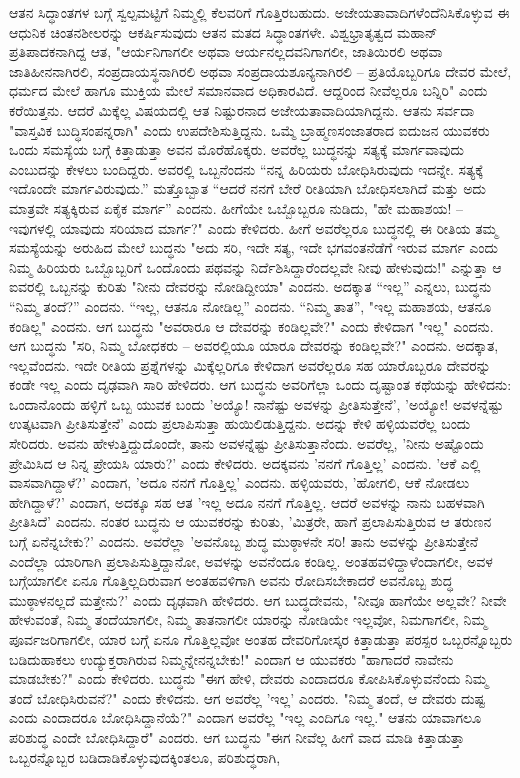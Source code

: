ಆತನ ಸಿದ್ಧಾಂತಗಳ ಬಗ್ಗೆ ಸ್ವಲ್ಪಮಟ್ಟಿಗೆ ನಿಮ್ಮಲ್ಲಿ ಕೆಲವರಿಗೆ ಗೊತ್ತಿರಬಹುದು. ಅಜೇಯತಾವಾದಿಗಳೆಂದೆನಿಸಿಕೊಳ್ಳುವ ಈ ಆಧುನಿಕ ಚಿಂತನಶೀಲರನ್ನು ಆಕರ್ಷಿಸುವುದು ಆತನ ಮತದ ಸಿದ್ಧಾಂತಗಳೇ. ವಿಶ್ವಭ್ರಾತೃತ್ವದ ಮಹಾನ್ ಪ್ರತಿಪಾದಕನಾಗಿದ್ದ ಆತ, "ಆರ್ಯನಿಗಾಗಲೀ ಅಥವಾ ಆರ್ಯನಲ್ಲದವನಿಗಾಗಲೀ, ಜಾತಿಯಿರಲಿ ಅಥವಾ ಜಾತಿಹೀನನಾಗಿರಲಿ, ಸಂಪ್ರದಾಯಸ್ಥನಾಗಿರಲಿ ಅಥವಾ ಸಂಪ್ರದಾಯಶೂನ್ಯನಾಗಿರಲಿ – ಪ್ರತಿಯೊಬ್ಬರಿಗೂ ದೇವರ ಮೇಲೆ, ಧರ್ಮದ ಮೇಲೆ ಹಾಗೂ ಮುಕ್ತಿಯ ಮೇಲೆ ಸಮಾನವಾದ ಅಧಿಕಾರವಿದೆ. ಆದ್ದರಿಂದ ನೀವೆಲ್ಲರೂ ಬನ್ನಿರಿ" ಎಂದು ಕರೆಯಿತ್ತನು. ಆದರೆ ಮಿಕ್ಕೆಲ್ಲ ವಿಷಯದಲ್ಲಿ ಆತ ನಿಷ್ಟುರನಾದ ಅಜೇಯತಾವಾದಿಯಾಗಿದ್ದನು. ಆತನು ಸರ್ವದಾ "ವಾಸ್ತವಿಕ ಬುದ್ಧಿಸಂಪನ್ನರಾಗಿ" ಎಂದು ಉಪದೇಶಿಸುತ್ತಿದ್ದನು. ಒಮ್ಮೆ ಬ್ರಾಹ್ಮಣಸಂಜಾತರಾದ ಐದುಜನ ಯುವಕರು ಒಂದು ಸಮಸ್ಯೆಯ ಬಗ್ಗೆ ಕಿತ್ತಾಡುತ್ತಾ ಅವನ ಮೊರೆಹೊಕ್ಕರು. ಅವರೆಲ್ಲ ಬುದ್ಧನನ್ನು ಸತ್ಯಕ್ಕೆ ಮಾರ್ಗವಾವುದು ಎಂಬುದನ್ನು ಕೇಳಲು ಬಂದಿದ್ದರು. ಅವರಲ್ಲಿ ಒಬ್ಬನೆಂದನು “ನನ್ನ ಹಿರಿಯರು ಬೋಧಿಸಿರುವುದು ಇದನ್ನೇ. ಸತ್ಯಕ್ಕೆ ಇದೊಂದೇ ಮಾರ್ಗವಿರುವುದು.” ಮತ್ತೊಬ್ಬಾತ “ಆದರೆ ನನಗೆ ಬೇರೆ ರೀತಿಯಾಗಿ ಬೋಧಿಸಲಾಗಿದೆ ಮತ್ತು ಅದು ಮಾತ್ರವೇ ಸತ್ಯಕ್ಕಿರುವ ಏಕೈಕ ಮಾರ್ಗ” ಎಂದನು. ಹೀಗೆಯೇ ಒಬ್ಬೊಬ್ಬರೂ ನುಡಿದು, "ಹೇ ಮಹಾಶಯ! – ಇವುಗಳಲ್ಲಿ ಯಾವುದು ಸರಿಯಾದ ಮಾರ್ಗ?" ಎಂದು ಕೇಳಿದರು. ಹೀಗೆ ಅವರೆಲ್ಲರೂ ಬುದ್ಧನಲ್ಲಿ ಈ ರೀತಿಯ ತಮ್ಮ ಸಮಸ್ಯೆಯನ್ನು ಅರುಹಿದ ಮೇಲೆ ಬುದ್ಧನು "ಅದು ಸರಿ, ಇದೇ ಸತ್ಯ, ಇದೇ ಭಗವಂತನೆಡೆಗೆ ಇರುವ ಮಾರ್ಗ ಎಂದು ನಿಮ್ಮ ಹಿರಿಯರು ಒಬ್ಬೊಬ್ಬರಿಗೆ ಒಂದೊಂದು ಪಥವನ್ನು ನಿರ್ದೆಶಿಸಿದ್ದಾರೆಂದಲ್ಲವೇ ನೀವು ಹೇಳುವುದು!" ಎನ್ನುತ್ತಾ ಆ ಐವರಲ್ಲಿ ಒಬ್ಬನನ್ನು ಕುರಿತು "ನೀನು ದೇವರನ್ನು ನೋಡಿದ್ದೀಯಾ" ಎಂದನು. ಅದಕ್ಕಾತ “ಇಲ್ಲ” ಎನ್ನಲು, ಬುದ್ಧನು “ನಿಮ್ಮ ತಂದೆ?” ಎಂದನು. “ಇಲ್ಲ, ಆತನೂ ನೋಡಿಲ್ಲ” ಎಂದನು. “ನಿಮ್ಮ ತಾತ”, "ಇಲ್ಲ ಮಹಾಶಯ, ಆತನೂ ಕಂಡಿಲ್ಲ" ಎಂದನು. ಆಗ ಬುದ್ಧನು "ಅವರಾರೂ ಆ ದೇವರನ್ನು ಕಂಡಿಲ್ಲವೇ?" ಎಂದು ಕೇಳಿದಾಗ "ಇಲ್ಲ" ಎಂದನು. ಆಗ ಬುದ್ಧನು "ಸರಿ, ನಿಮ್ಮ ಬೋಧಕರು – ಅವರಲ್ಲಿಯೂ ಯಾರೂ ದೇವರನ್ನು ಕಂಡಿಲ್ಲವೇ?" ಎಂದನು. ಅದಕ್ಕಾತ, ಇಲ್ಲವೆಂದನು. ಇದೇ ರೀತಿಯ ಪ್ರಶ್ನೆಗಳನ್ನು ಮಿಕ್ಕೆಲ್ಲರಿಗೂ ಕೇಳಿದಾಗ ಅವರೆಲ್ಲರೂ ಸಹ ಯಾರೊಬ್ಬರೂ ದೇವರನ್ನು ಕಂಡೇ ಇಲ್ಲ ಎಂದು ದೃಢವಾಗಿ ಸಾರಿ ಹೇಳಿದರು. ಆಗ ಬುದ್ಧನು ಅವರಿಗೆಲ್ಲಾ ಒಂದು ದೃಷ್ಟಾಂತ ಕಥೆಯನ್ನು ಹೇಳಿದನು: ಒಂದಾನೊಂದು ಹಳ್ಳಿಗೆ ಒಬ್ಬ ಯುವಕ ಬಂದು 'ಅಯ್ಯೊ! ನಾನೆಷ್ಟು ಅವಳನ್ನು ಪ್ರೀತಿಸುತ್ತೇನೆ', 'ಅಯ್ಯೋ! ಅವಳನ್ನೆಷ್ಟು ಉತ್ಕಟವಾಗಿ ಪ್ರೀತಿಸುತ್ತೇನೆ' ಎಂದು ಪ್ರಲಾಪಿಸುತ್ತಾ ಹುಯಿಲಿಡುತ್ತಿದ್ದನು. ಅದನ್ನು ಕೇಳಿ ಹಳ್ಳಿಯವರೆಲ್ಲ ಬಂದು ಸೇರಿದರು. ಅವನು ಹೇಳುತ್ತಿದ್ದುದೊಂದೇ, ತಾನು ಅವಳನ್ನೆಷ್ಟು ಪ್ರೀತಿಸುತ್ತಾನೆಂದು. ಅವರೆಲ್ಲ, 'ನೀನು ಅಷ್ಟೊಂದು ಪ್ರೇಮಿಸಿದ ಆ ನಿನ್ನ ಪ್ರೇಯಸಿ ಯಾರು?' ಎಂದು ಕೇಳಿದರು. ಅದಕ್ಕವನು 'ನನಗೆ ಗೊತ್ತಿಲ್ಲ' ಎಂದನು. 'ಆಕೆ ಎಲ್ಲಿ ವಾಸವಾಗಿದ್ದಾಳೆ?' ಎಂದಾಗ, 'ಅದೂ ನನಗೆ ಗೊತ್ತಿಲ್ಲ' ಎಂದನು. ಹಳ್ಳಿಯವರು, 'ಹೋಗಲಿ, ಆಕೆ ನೋಡಲು ಹೇಗಿದ್ದಾಳೆ?' ಎಂದಾಗ, ಅದಕ್ಕೂ ಸಹ ಆತ 'ಇಲ್ಲ ಅದೂ ನನಗೆ ಗೊತ್ತಿಲ್ಲ. ಆದರೆ ಅವಳನ್ನು ನಾನು ಬಹಳವಾಗಿ ಪ್ರೀತಿಸಿದೆ' ಎಂದನು. ನಂತರ ಬುದ್ಧನು ಆ ಯುವಕರನ್ನು ಕುರಿತು, 'ಮಿತ್ರರೇ, ಹಾಗೆ ಪ್ರಲಾಪಿಸುತ್ತಿರುವ ಆ ತರುಣನ ಬಗ್ಗೆ ಏನೆನ್ನಬೇಕು?' ಎಂದನು. ಅವರೆಲ್ಲಾ 'ಅವನೊಬ್ಬ ಶುದ್ಧ ಮುಠ್ಠಾಳನೇ ಸರಿ! ತಾನು ಅವಳನ್ನು ಪ್ರೀತಿಸುತ್ತೇನೆ ಎಂದೆಲ್ಲಾ ಯಾರಿಗಾಗಿ ಪ್ರಲಾಪಿಸುತ್ತಿದ್ದಾನೋ, ಅವಳನ್ನು ಅವನೆಂದೂ ಕಂಡಿಲ್ಲ. ಅಂತಹವಳಿದ್ದಾಳೆಂದಾಗಲೀ, ಅವಳ ಬಗ್ಗೆಯಾಗಲೀ ಏನೂ ಗೊತ್ತಿಲ್ಲದಿರುವಾಗ ಅಂತಹವಳಿಗಾಗಿ ಅವನು ರೋದಿಸಬೇಕಾದರೆ ಅವನೊಬ್ಬ ಶುದ್ಧ ಮುಠ್ಠಾಳನಲ್ಲದೆ ಮತ್ತೇನು?' ಎಂದು ದೃಢವಾಗಿ ಹೇಳಿದರು. ಆಗ ಬುದ್ಧದೇವನು, "ನೀವೂ ಹಾಗೆಯೇ ಅಲ್ಲವೇ? ನೀವೇ ಹೇಳುವಂತೆ, ನಿಮ್ಮ ತಂದೆಯಾಗಲೀ, ನಿಮ್ಮ ತಾತನಾಗಲೀ ಯಾರನ್ನು ನೋಡಿಯೇ ಇಲ್ಲವೋ, ನಿಮಗಾಗಲೀ, ನಿಮ್ಮ ಪೂರ್ವಜರಿಗಾಗಲೀ, ಯಾರ ಬಗ್ಗೆ ಏನೂ ಗೊತ್ತಿಲ್ಲವೋ ಅಂತಹ ದೇವರಿಗೋಸ್ಕರ ಕಿತ್ತಾಡುತ್ತಾ ಪರಸ್ಪರ ಒಬ್ಬರನ್ನೊಬ್ಬರು ಬಡಿದುಹಾಕಲು ಉದ್ಯುಕ್ತರಾಗಿರುವ ನಿಮ್ಮನ್ನೇನನ್ನಬೇಕು!" ಎಂದಾಗ ಆ ಯುವಕರು "ಹಾಗಾದರೆ ನಾವೇನು ಮಾಡಬೇಕು?" ಎಂದು ಕೇಳಿದರು. ಬುದ್ಧನು "ಈಗ ಹೇಳಿ, ದೇವರು ಎಂದಾದರೂ ಕೋಪಿಸಿಕೊಳ್ಳುವನೆಂದು ನಿಮ್ಮ ತಂದೆ ಬೋಧಿಸಿರುವನೆ?" ಎಂದು ಕೇಳಿದನು. ಆಗ ಅವರೆಲ್ಲ 'ಇಲ್ಲ' ಎಂದರು. "ನಿಮ್ಮ ತಂದೆ, ಆ ದೇವರು ದುಷ್ಟ ಎಂದು ಎಂದಾದರೂ ಬೋಧಿಸಿದ್ದಾನೆಯೆ?" ಎಂದಾಗ ಅವರೆಲ್ಲ "ಇಲ್ಲ ಎಂದಿಗೂ ಇಲ್ಲ." ಆತನು ಯಾವಾಗಲೂ ಪರಿಶುದ್ಧ ಎಂದೇ ಬೋಧಿಸಿದ್ದಾರೆ" ಎಂದರು. ಆಗ ಬುದ್ಧನು "ಈಗ ನೀವೆಲ್ಲ ಹೀಗೆ ವಾದ ಮಾಡಿ ಕಿತ್ತಾಡುತ್ತಾ ಒಬ್ಬರನ್ನೊಬ್ಬರ ಬಡಿದಾಡಿಕೊಳ್ಳುವುದಕ್ಕಿಂತಲೂ, ಪರಿಶುದ್ಧರಾಗಿ, 